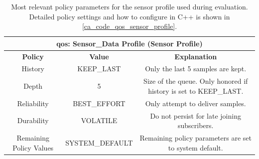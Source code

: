 \begin{table}[H]
    \centering
\begin{tabular}{ |c|c|c| }
\hline
\multicolumn{3}{|c|}{\gls{qos}: Sensor\_Data Profile (Sensor Profile)} \\
\hline
\hline
\textbf{Policy} & \textbf{Value} & \textbf{Explanation} \\\hline
    History & KEEP\_LAST &  
        \begin{minipage}{6cm}
	       \vspace{8pt}
		      Only the last 5 samples are kept.
	       \vspace{8pt}
	    \end{minipage} \\\hline
    Depth & 5 &  
        \begin{minipage}{6cm}
	       \vspace{8pt}
        Size of the queue. Only honored if history is set to KEEP\_LAST.
	       \vspace{8pt}
	    \end{minipage} \\\hline
    Reliability & BEST\_EFFORT &  
        \begin{minipage}{6cm}
	       \vspace{8pt}
		      Only attempt to deliver samples.
	       \vspace{8pt}
	    \end{minipage} \\\hline
    Durability & VOLATILE & 
        \begin{minipage}{6cm}
	       \vspace{8pt}
		      Do not persist for late joining subscribers.
	       \vspace{8pt}
	    \end{minipage} \\\hline
    Remaining Policy Values & SYSTEM\_DEFAULT & 
        \begin{minipage}{6cm}
	       \vspace{8pt}
		      Remaining policy parameters are set to system default.
	       \vspace{8pt}
	    \end{minipage} \\\hline
\end{tabular}
    \caption{Most relevant policy parameters for the sensor profile used during evaluation. Detailed policy settings and how to configure in C++ is shown in \autoref{ca_code_qos_sensor_profile}.}
    \label{c6_tab_sensor_qos}
\end{table}
